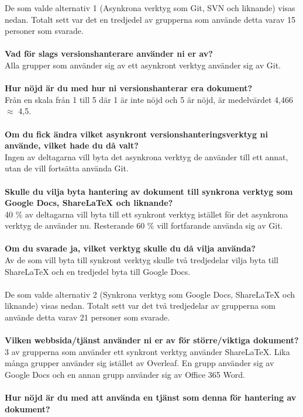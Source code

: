 De som valde alternativ 1 (Asynkrona verktyg som Git, SVN och liknande) visas nedan. Totalt sett var det en tredjedel av grupperna som använde detta varav 15 personer som svarade.\\\\
\textbf{Vad för slags versionshanterare använder ni er av?}\\
Alla grupper som använder sig av ett asynkront verktyg använder sig av Git.\\\\
\textbf{Hur nöjd är du med hur ni versionshanterar era dokument?}\\
Från en skala från 1 till 5 där 1 är inte nöjd och 5 är nöjd, är medelvärdet 4,466 $\approx$ 4,5.\\\\
\textbf{Om du fick ändra vilket asynkront versionshanteringsverktyg ni använde, vilket hade du då valt?}\\
Ingen av deltagarna vill byta det asynkrona verktyg de använder till ett annat, utan de vill fortsätta använda Git.\\\\
\textbf{Skulle du vilja byta hantering av dokument till synkrona verktyg som Google Docs, ShareLaTeX och liknande?}\\
40 \% av deltagarna vill byta till ett synkront verktyg istället för det asynkrona verktyg de använder nu. Resterande 60 \% vill fortfarande använda sig av Git.\\\\
\textbf{Om du svarade ja, vilket verktyg skulle du då vilja använda?}\\
Av de som vill byta till synkront verktyg skulle två tredjedelar vilja byta till ShareLaTeX och en tredjedel byta till Google Docs.\\\\
De som valde alternativ 2 (Synkrona verktyg som Google Docs, ShareLaTeX och liknande) visas nedan. Totalt sett var det två tredjedelar av grupperna som använde detta varav 21 personer som svarade.\\\\
\textbf{Vilken webbsida/tjänst använder ni er av för större/viktiga dokument?}\\
3 av grupperna som använder ett synkront verktyg använder ShareLaTeX. Lika många grupper använder sig istället av Overleaf. En grupp använder sig av Google Docs och en annan grupp använder sig av Office 365 Word.\\\\
\textbf{Hur nöjd är du med att använda en tjänst som denna för hantering av dokument?}\\
